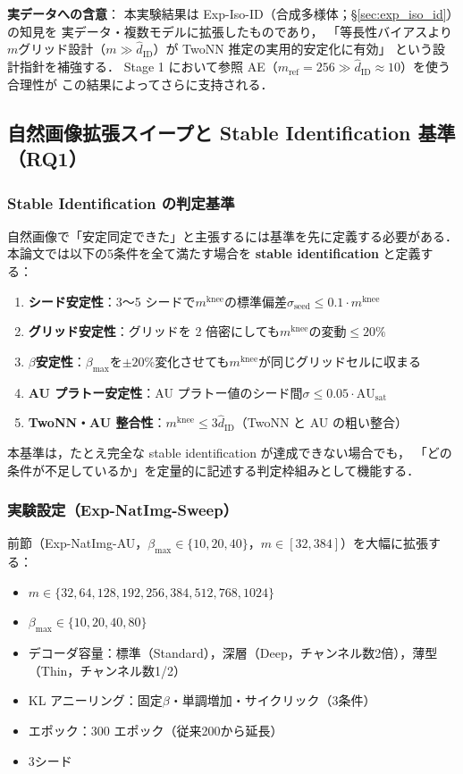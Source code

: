 \documentclass[11pt,a4paper]{jsarticle}
\newcommand{\AUsat}{\mathrm{AU}_{\mathrm{sat}}}
\newcommand{\mknee}{m^{\mathrm{knee}}}
\begin{document}
\textbf{実データへの含意}：
本実験結果は Exp-Iso-ID（合成多様体；§\ref{sec:exp_iso_id}）の知見を
実データ・複数モデルに拡張したものであり，
「等長性バイアスより$m$グリッド設計（$m \gg \hat{d}_\mathrm{ID}$）が TwoNN 推定の実用的安定化に有効」
という設計指針を補強する．
Stage 1 において参照 AE（$m_\mathrm{ref}=256 \gg \hat{d}_\mathrm{ID} \approx 10$）を使う合理性が
この結果によってさらに支持される．

\subsection{自然画像拡張スイープと Stable Identification 基準（RQ1）}\label{sec:exp_natimg_sweep}

\subsubsection*{Stable Identification の判定基準}\label{sec:natimg_stable_id}

自然画像で「安定同定できた」と主張するには基準を先に定義する必要がある．
本論文では以下の5条件を全て満たす場合を \textbf{stable identification} と定義する：

\begin{enumerate}
  \item \textbf{シード安定性}：3〜5 シードで$\mknee$の標準偏差$\sigma_\mathrm{seed} \leq 0.1 \cdot \mknee$
  \item \textbf{グリッド安定性}：グリッドを 2 倍密にしても$\mknee$の変動$\leq 20\%$
  \item \textbf{$\beta$安定性}：$\beta_{\max}$を$\pm 20\%$変化させても$\mknee$が同じグリッドセルに収まる
  \item \textbf{AU プラトー安定性}：AU プラトー値のシード間$\sigma \leq 0.05 \cdot \AUsat$
  \item \textbf{TwoNN・AU 整合性}：$\mknee \leq 3 \hat{d}_\mathrm{ID}$（TwoNN と AU の粗い整合）
\end{enumerate}

本基準は，たとえ完全な stable identification が達成できない場合でも，
「どの条件が不足しているか」を定量的に記述する判定枠組みとして機能する．

\subsubsection*{実験設定（Exp-NatImg-Sweep）}

前節（Exp-NatImg-AU，$\beta_{\max} \in \{10,20,40\}$，$m \in [32,384]$）を大幅に拡張する：
\begin{itemize}
  \item $m \in \{32, 64, 128, 192, 256, 384, 512, 768, 1024\}$
  \item $\beta_{\max} \in \{10, 20, 40, 80\}$
  \item デコーダ容量：標準（Standard），深層（Deep，チャンネル数2倍），薄型（Thin，チャンネル数1/2）
  \item KL アニーリング：固定$\beta$・単調増加・サイクリック（3条件）
  \item エポック：300 エポック（従来200から延長）
  \item 3シード
\end{itemize}
\end{document}

